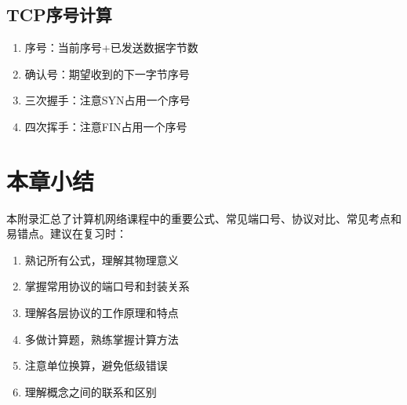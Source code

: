 \subsection{TCP序号计算}
\begin{enumerate}[leftmargin=2em,itemsep=0pt]
    \item 序号：当前序号+已发送数据字节数
    \item 确认号：期望收到的下一字节序号
    \item 三次握手：注意SYN占用一个序号
    \item 四次挥手：注意FIN占用一个序号
\end{enumerate}

\section{本章小结}

本附录汇总了计算机网络课程中的重要公式、常见端口号、协议对比、常见考点和易错点。建议在复习时：

\begin{enumerate}[leftmargin=2em,itemsep=0pt]
    \item 熟记所有公式，理解其物理意义
    \item 掌握常用协议的端口号和封装关系
    \item 理解各层协议的工作原理和特点
    \item 多做计算题，熟练掌握计算方法
    \item 注意单位换算，避免低级错误
    \item 理解概念之间的联系和区别
\end{enumerate}
